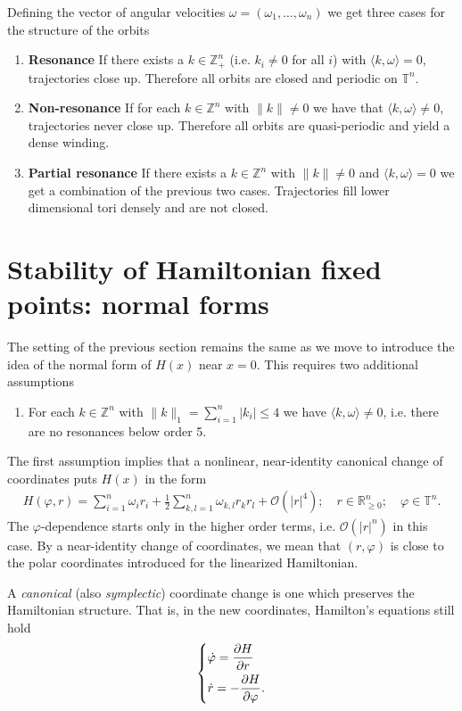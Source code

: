 Defining the vector of angular velocities $\omega=(\omega_1, \ldots, \omega_n)$ we get three cases for the structure of the orbits
\begin{enumerate}
	\item \textbf{Resonance} If there exists a $k\in\mathbb{Z}^{n}_{+}$ (i.e. $k_i\neq 0$ for all $i$) with $\langle k, \omega \rangle = 0$, trajectories close up. Therefore all orbits are closed and periodic on $\mathbb{T}^{n}$.
	\item \textbf{Non-resonance} If for each $k\in\mathbb{Z}^{n}$ with $\|k\|\neq 0$ we have that $\langle k, \omega \rangle \neq 0$, trajectories never close up. Therefore all orbits are quasi-periodic and yield a dense winding. 
	\item \textbf{Partial resonance} If there exists a $k\in \mathbb{Z}^{n}$ with $\|k\|\neq 0$ and $\langle k, \omega \rangle =0$ we get a combination of the previous two cases. Trajectories fill lower dimensional tori densely and are not closed.
\end{enumerate}

\section{Stability of Hamiltonian fixed points: normal forms}
The setting of the previous section remains the same as we move to introduce the idea of the normal form of $H(x)$ near $x=0$. This requires two additional assumptions
\begin{enumerate}
	\item For each $k\in \mathbb{Z}^{n}$ with $\|k\|_{1} = \sum_{i=1}^{n} |k_i| \leq 4$ we have $\langle k, \omega \rangle \neq 0$, i.e. there are no resonances below order 5.
\end{enumerate}
The first assumption implies that a nonlinear, near-identity canonical change of coordinates puts $H(x)$ in the form
\begin{align}
	H(\varphi, r) = \sum_{i=1}^{n} \omega_i r_i + \frac{1}{2}\sum_{k,l=1}^{n} \omega_{k,l}r_{k}r_{l} + \mathcal{O}\left(|r|^{4}\right);\quad r \in \mathbb{R}^{n}_{\geq 0};\quad \varphi \in \mathbb{T}^{n}.
\end{align}
The $\varphi$-dependence starts only in the higher order terms, i.e. $\mathcal{O}\left( |r|^{n}\right)$ in this case. By a near-identity change of coordinates, we mean that $(r,\varphi)$ is close to the polar coordinates introduced for the linearized Hamiltonian.

\begin{definition}
	A \emph{canonical} (also \emph{symplectic}) coordinate change is one which preserves the Hamiltonian structure. That is, in the new coordinates, Hamilton's equations still hold
	\begin{align}
		\begin{dcases}
		\dot{\varphi} = \frac{\partial H}{\partial r} \\
		\dot{r} = -\frac{\partial H}{\partial \varphi}.
		\end{dcases}
	\end{align}
\end{definition}

